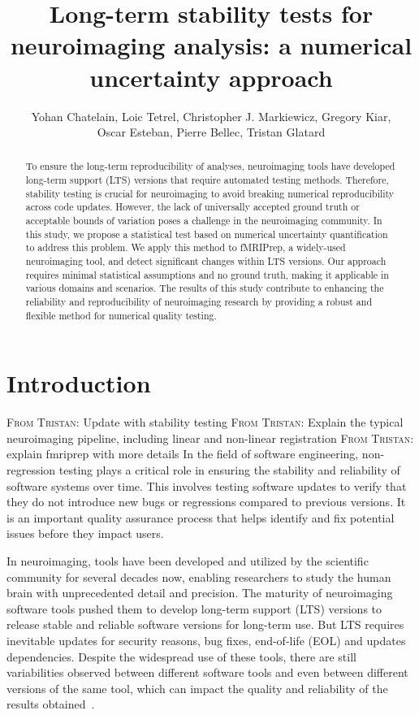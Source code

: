 \documentclass[lettersize,journal]{IEEEtran}
\title{Long-term stability tests for neuroimaging analysis: a numerical uncertainty approach}
\author{Yohan Chatelain, Loic Tetrel, Christopher J. Markiewicz, Gregory Kiar,\\ Oscar Esteban,  Pierre Bellec, Tristan Glatard}
\newcommand{\TG}[1]{\color{blue}\textsc{From Tristan:} #1\color{black}\xspace}
\newcommand{\fmriprep}{fMRIPrep\xspace}
\begin{document}
\maketitle

\begin{abstract}
    To ensure the long-term reproducibility of analyses, neuroimaging tools have developed long-term support (LTS) versions that require automated testing methods. Therefore, stability testing is crucial for neuroimaging to avoid breaking numerical reproducibility across code updates. However, the lack of universally accepted ground truth or acceptable bounds of variation poses a challenge in the neuroimaging community. In this study, we propose a statistical test based on numerical uncertainty quantification to address this problem. We apply this method to \fmriprep, a widely-used neuroimaging tool, and detect significant changes within LTS versions. Our approach requires minimal statistical assumptions and no ground truth, making it applicable in various domains and scenarios. The results of this study contribute to enhancing the reliability and reproducibility of neuroimaging research by providing a robust and flexible method for numerical quality testing.
\end{abstract}

\section{Introduction}

\TG{Update with stability testing}
\TG{Explain the typical neuroimaging pipeline, including linear and non-linear registration}
\TG{explain fmriprep with more details}
In the field of software engineering, non-regression testing plays a critical role in ensuring the stability and reliability of software systems over time. This involves testing software updates to verify that they do not introduce new bugs or regressions compared to previous versions. It is an important quality assurance process that helps identify and fix potential issues before they impact users.

In neuroimaging, tools have been developed and utilized by the scientific community for several decades now, enabling researchers to study the human brain with unprecedented detail and precision. The maturity of neuroimaging software tools pushed them to develop long-term support (LTS) versions to release stable and reliable software versions for long-term use. But LTS requires inevitable updates for security reasons, bug fixes, end-of-life (EOL) and updates dependencies. Despite the widespread use of these tools, there are still variabilities observed between different software tools and even between different versions of the same tool, which can impact the quality and reliability of the results obtained~\cite{glatard2015reproducibility, bhagwat2021understanding}.
\end{document}
